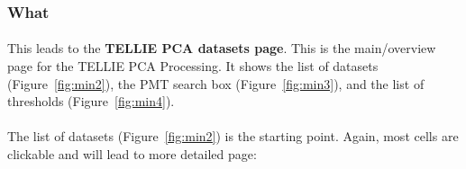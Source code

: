 \documentclass[12pt]{article}
\begin{document}
\subsubsection{What}
\paragraph{}
This leads to the \textbf{TELLIE PCA datasets page}. This is the main/overview page for the TELLIE PCA Processing. It shows the list of datasets (Figure~\ref{fig:min2}), the PMT search box (Figure~\ref{fig:min3}), and the list of thresholds (Figure~\ref{fig:min4}).
\paragraph{}
The list of datasets (Figure~\ref{fig:min2}) is the starting point. Again, most cells are clickable and will lead to more detailed page:
\end{document}
